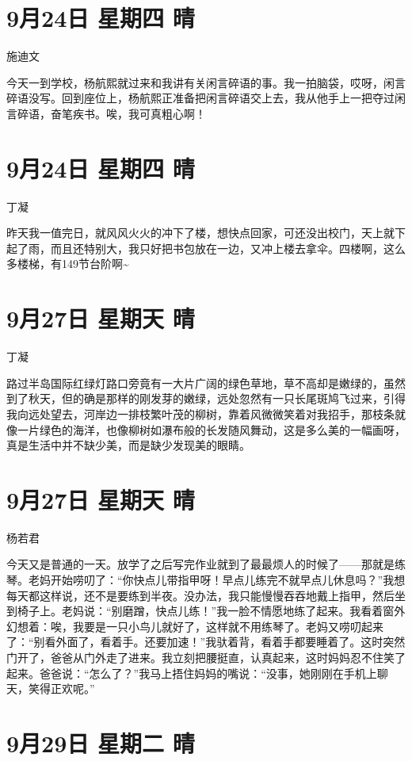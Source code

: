 \section{9月24日 星期四 晴}

施迪文

今天一到学校，杨航熙就过来和我讲有关闲言碎语的事。我一拍脑袋，哎呀，闲言碎语没写。回到座位上，杨航熙正准备把闲言碎语交上去，我从他手上一把夺过闲言碎语，奋笔疾书。唉，我可真粗心啊！

\section{9月24日 星期四 晴}

丁凝

昨天我一值完日，就风风火火的冲下了楼，想快点回家，可还没出校门，天上就下起了雨，而且还特别大，我只好把书包放在一边，又冲上楼去拿伞。四楼啊，这么多楼梯，有149节台阶啊\textasciitilde{}

\section{9月27日 星期天 晴}

丁凝

路过半岛国际红绿灯路口旁竟有一大片广阔的绿色草地，草不高却是嫩绿的，虽然到了秋天，但的确是那样的刚发芽的嫩绿，远处忽然有一只长尾斑鸠飞过来，引得我向远处望去，河岸边一排枝繁叶茂的柳树，靠着风微微笑着对我招手，那枝条就像一片绿色的海洋，也像柳树如瀑布般的长发随风舞动，这是多么美的一幅画呀，真是生活中并不缺少美，而是缺少发现美的眼睛。

\section{9月27日 星期天 晴}

杨若君

今天又是普通的一天。放学了之后写完作业就到了最最烦人的时候了------那就是练琴。老妈开始唠叨了：``你快点儿带指甲呀！早点儿练完不就早点儿休息吗？''我想每天都这样说，还不是要练到半夜。没办法，我只能慢慢吞吞地戴上指甲，然后坐到椅子上。老妈说：``别磨蹭，快点儿练！''我一脸不情愿地练了起来。我看着窗外幻想着：唉，我要是一只小鸟儿就好了，这样就不用练琴了。老妈又唠叨起来了：``别看外面了，看着手。还要加速！''我驮着背，看着手都要睡着了。这时突然门开了，爸爸从门外走了进来。我立刻把腰挺直，认真起来，这时妈妈忍不住笑了起来。爸爸说：``怎么了？''我马上捂住妈妈的嘴说：``没事，她刚刚在手机上聊天，笑得正欢呢。''

\section{9月29日 星期二 晴}

